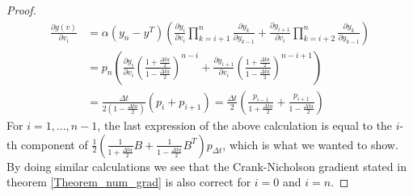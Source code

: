 \begin{proof}
\begin{align*}
\frac{\partial g(v)}{\partial v_i} &= \alpha(y_n-y^T)(\frac{\partial y_{i}}{\partial v_{i}}\prod_{k=i+1}^{n}\frac{\partial y_k}{\partial y_{k-1}} +\frac{\partial y_{i+1}}{\partial v_{i}}\prod_{k=i+2}^{n}\frac{\partial y_k}{\partial y_{k-1}}) \\
&= p_n(\frac{\partial y_{i}}{\partial v_{i}}(\frac{1+\frac{\Delta ta }{2}}{1-\frac{\Delta ta }{2}})^{n-i}+\frac{\partial y_{i+1}}{\partial v_{i}}(\frac{1+\frac{\Delta ta }{2}}{1-\frac{\Delta ta }{2}})^{n-i+1}) \\
&=\frac{\Delta t}{2(1-\frac{\Delta t a}{2})}(p_i+p_{i+1}) = \frac{\Delta t}{2}(\frac{p_{i-1}}{1+ \frac{\Delta t a}{2}}+\frac{p_{i+1}}{1- \frac{\Delta t a}{2}})
\end{align*}
For $i=1,...,n-1$, the last expression of the above calculation is equal to the $i$-th component of $ \frac{1}{2}( \frac{1}{1+\frac{\Delta t a}{2}} B+\frac{1}{1-\frac{\Delta t a}{2}}B^T)p_{\Delta t}$, which is what we wanted to show. By doing similar calculations we see that the Crank-Nicholson gradient stated in theorem \ref{Theorem_num_grad} is also correct for $i=0$ and $i=n$.
\end{proof}
